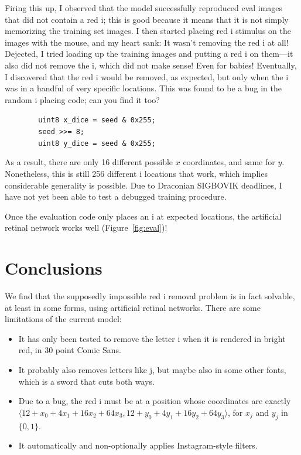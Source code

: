 \documentclass[twocolumn]{article}
\begin{document}
Firing this up, I observed that the model successfully reproduced eval
images that did not contain a red i; this is good because it means
that it is not simply memorizing the training set images. I then
started placing red i stimulus on the images with the mouse, and my
heart sank: It wasn't removing the red i at all! Dejected, I tried
loading up the training images and putting a red i on them---it also
did not remove the i, which did not make sense! Even for babies!
Eventually, I discovered that the red i would be removed, as expected,
but only when the i was in a handful of very specific locations. This
was found to be a bug in the random i placing code; can you find it too?

\smallskip
\noindent \verb+        uint8 x_dice = seed & 0x255;+ \\
          \verb+        seed >>= 8;+ \\
          \verb+        uint8 y_dice = seed & 0x255;+
\smallskip

As a result, there are only 16 different possible $x$ coordinates, and same
for $y$. Nonetheless, this is still 256 different i locations that work,
which implies considerable generality is possible. Due to Draconian SIGBOVIK
deadlines, I have not yet been able to test a debugged training procedure.

Once the evaluation code only places an i at expected locations, the artificial
retinal network works well (Figure~\ref{fig:eval})!


\section{Conclusions}

We find that the supposedly impossible red i removal problem is in
fact solvable, at least in some forms, using artificial retinal
networks. There are some limitations of the current model:
\begin{itemize}
\item It has only been tested to remove the letter i when it is rendered
  in bright red, in 30 point Comic Sans.
\item It probably also removes letters like j, but maybe also in some
  other fonts, which is a sword that cuts both ways.
\item Due to a bug, the red i must be at a position whose coordinates are exactly
  $\langle 12 + x_0 + 4x_1 + 16x_2 + 64x_3, 12 + y_0 + 4y_1 + 16y_2 + 64y_3 \rangle$,
for $x_j$ and $y_j$ in $\{0, 1\}$.
\item It automatically and non-optionally applies Instagram-style filters.
\end{itemize}
\end{document}
